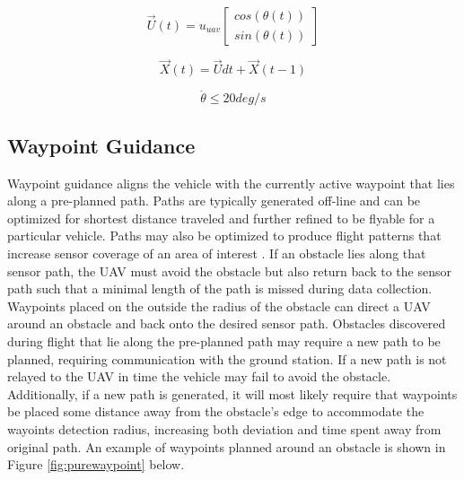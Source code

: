 \documentclass[conf]{new-aiaa}
\begin{document}
\begin{equation}
\label{uavVelocity}
\overrightarrow{U}(t) = u_{uav} \begin{bmatrix}
cos(\theta(t)) \\
sin(\theta(t))
\end{bmatrix}
\end{equation}


\begin{equation}
\label{uavPosition}
\overrightarrow{X}(t) = \overrightarrow{U}dt + \overrightarrow{X}(t-1)
\end{equation}


\begin{equation}
\label{turnRate}
\dot{\theta} \leq 20 deg/s
\end{equation}



\subsection{Waypoint Guidance}
Waypoint guidance aligns the vehicle with the currently active waypoint that lies along a pre-planned path. Paths are typically generated off-line and can be optimized for shortest distance traveled and further refined to be flyable for a particular vehicle. Paths may also be optimized to produce flight patterns that increase sensor coverage of an area of interest \cite{wilhelm_direct_2017}. If an obstacle lies along that sensor path, the UAV must avoid the obstacle but also return back to the sensor path such that a minimal length of the path is missed during data collection. Waypoints placed on the outside the radius of the obstacle can direct a UAV around an obstacle and back onto the desired sensor path. Obstacles discovered during flight that lie along the pre-planned path may require a new path to be planned, requiring communication with the ground station. If a new path is not relayed to the UAV in time the vehicle may fail to avoid the obstacle. Additionally, if a new path is generated, it will most likely require that waypoints be placed some distance away from the obstacle's edge to accommodate the wayoints detection radius, increasing both deviation and time spent away from original path. An example of waypoints planned around an obstacle is shown in Figure \ref{fig:purewaypoint} below. 
\end{document}
